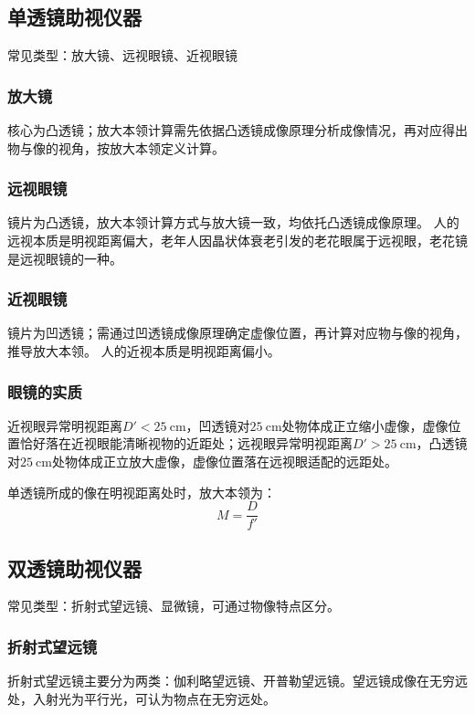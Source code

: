 \documentclass{article}
\begin{document}
	\subsection{单透镜助视仪器}
	常见类型：放大镜、远视眼镜、近视眼镜
	
	\subsubsection{放大镜}
	核心为凸透镜；放大本领计算需先依据凸透镜成像原理分析成像情况，再对应得出物与像的视角，按放大本领定义计算。
	
	\subsubsection{远视眼镜}
	镜片为凸透镜，放大本领计算方式与放大镜一致，均依托凸透镜成像原理。
	人的远视本质是明视距离偏大，老年人因晶状体衰老引发的老花眼属于远视眼，老花镜是远视眼镜的一种。
	
	\subsubsection{近视眼镜}
	镜片为凹透镜；需通过凹透镜成像原理确定虚像位置，再计算对应物与像的视角，推导放大本领。
	人的近视本质是明视距离偏小。
	
	\subsubsection{眼镜的实质}
	近视眼异常明视距离$D'<25\ \mathrm{cm}$，凹透镜对$25\ \mathrm{cm}$处物体成正立缩小虚像，虚像位置恰好落在近视眼能清晰视物的近距处；远视眼异常明视距离$D'>25\ \mathrm{cm}$，凸透镜对$25\ \mathrm{cm}$处物体成正立放大虚像，虚像位置落在远视眼适配的远距处。
	
	单透镜所成的像在明视距离处时，放大本领为：
	\[
	M=\frac{D}{f'}
	\]
	
	\subsection{双透镜助视仪器}
	常见类型：折射式望远镜、显微镜，可通过物像特点区分。
	
	\subsubsection{折射式望远镜}
	折射式望远镜主要分为两类：伽利略望远镜、开普勒望远镜。望远镜成像在无穷远处，入射光为平行光，可认为物点在无穷远处。
	
\end{document}
